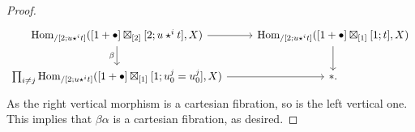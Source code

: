 \documentclass[10pt,a4paper]{amsart}
\newcommand{\Hom}{\mathrm{Hom}}
\begin{document}
\begin{proof}
\[\begin{tikzcd}
	{\Hom_{/[2;u\star^i t]}([1+\bullet]\boxtimes_{[2]}[2;u\star^i t],X)} & {\Hom_{/[2;u\star^i t]}([1+\bullet]\boxtimes_{[1]}[1;t],X)} \\
	{\prod_{i\neq j}\Hom_{/[2;u\star^i t]}([1+\bullet]\boxtimes_{[1]}[1;u_0^j =u_0^j],X)} & \ast.
	\arrow[from=1-1, to=1-2]
	\arrow["\beta"', from=1-1, to=2-1]
	\arrow[from=1-2, to=2-2]
	\arrow[from=2-1, to=2-2]
\end{tikzcd}\]
As the right vertical morphism is a  cartesian fibration, so is the left vertical one. This implies that $\beta\alpha$ is a cartesian fibration, as desired.
\end{proof}
\end{document}
